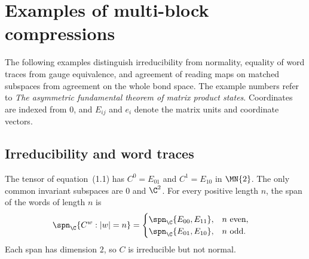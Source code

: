 
\section{Examples of multi-block compressions}

The following examples distinguish irreducibility from normality, equality of
word traces from gauge equivalence, and agreement of reading maps on matched
subspaces from agreement on the whole bond space. The example numbers refer to
\emph{The asymmetric fundamental theorem of matrix product states}. Coordinates
are indexed from $0$, and $E_{ij}$ and $e_i$ denote the matrix units and
coordinate vectors.

\subsection{Irreducibility and word traces}

\begin{lemma}
    \label{lem:asym_example_periodic}
    \leanok
    The tensor of equation~(1.1) has $C^0=E_{01}$ and $C^1=E_{10}$ in $\MN{2}$.
    The only common invariant
    subspaces are $0$ and $\C^2$. For every positive length $n$, the span of the
    words of length $n$ is
    \begin{align}
        \spn_{\C}\{C^w:|w|=n\}
         & =\begin{cases}
                \spn_{\C}\{E_{00},E_{11}\}, & n\text{ even}, \\
                \spn_{\C}\{E_{01},E_{10}\}, & n\text{ odd}.
            \end{cases}
    \end{align}
    Each span has dimension $2$, so $C$ is irreducible but not normal.
\end{lemma}

